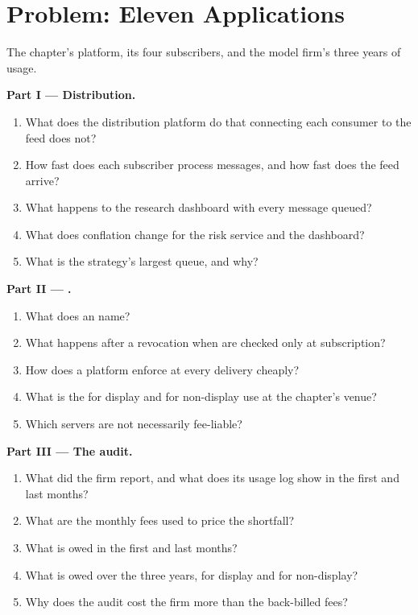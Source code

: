 \section{Problem: Eleven Applications}

\begin{problem}\label{pb:pl:market-data-distribution-and-entitlements:1}
The chapter's platform, its four subscribers, and the model firm's three years of usage.

\medskip\noindent\textbf{Part I --- Distribution.}
\begin{enumerate}
\item What does the distribution platform do that connecting each consumer to the feed does not?
\item How fast does each subscriber process messages, and how fast does the feed arrive?
\item What happens to the research dashboard with every message queued?
\item What does conflation change for the risk service and the dashboard?
\item What is the strategy's largest queue, and why?
\end{enumerate}

\medskip\noindent\textbf{Part II --- .}
\begin{enumerate}[resume]
\item What does an  name?
\item What happens after a revocation when  are checked only at subscription?
\item How does a platform enforce  at every delivery cheaply?
\item What is the  for display and for non-display use at the chapter's venue?
\item Which servers are not necessarily fee-liable?
\end{enumerate}

\medskip\noindent\textbf{Part III --- The audit.}
\begin{enumerate}[resume]
\item What did the firm report, and what does its usage log show in the first and last months?
\item What are the monthly fees used to price the shortfall?
\item What is owed in the first and last months?
\item What is owed over the three years, for display and for non-display?
\item Why does the audit cost the firm more than the back-billed fees?
\end{enumerate}


\end{problem}
